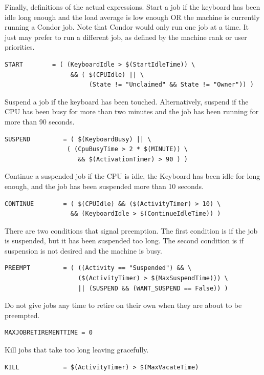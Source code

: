 Finally, definitions of the actual expressions.
Start a job if 
the keyboard has been idle long enough and
the load average is low enough OR the machine is currently
running a Condor job.
Note that Condor would only run one job at a time.
It just may prefer to run a different job, as defined by
the machine rank or user priorities.
\begin{verbatim}
START        = ( (KeyboardIdle > $(StartIdleTime)) \
                  && ( $(CPUIdle) || \
                       (State != "Unclaimed" && State != "Owner")) )
\end{verbatim}

Suspend a job if the keyboard has been touched.
Alternatively, suspend if the CPU has been busy for more than two minutes
and the job has been running for more than 90 seconds.
\begin{verbatim}
SUSPEND         = ( $(KeyboardBusy) || \
                 ( (CpuBusyTime > 2 * $(MINUTE)) \
                    && $(ActivationTimer) > 90 ) )
\end{verbatim}

Continue a suspended job if the CPU is idle, the Keyboard has been
idle for long enough, and the job has been suspended more
than 10 seconds.
\begin{verbatim}
CONTINUE        = ( $(CPUIdle) && ($(ActivityTimer) > 10) \
                  && (KeyboardIdle > $(ContinueIdleTime)) )
\end{verbatim}

There are two conditions that signal preemption.
The first condition is if the job is suspended,
but it has been suspended too long.
The second condition is if suspension is not desired and the machine is busy. 
\begin{verbatim}
PREEMPT	        = ( ((Activity == "Suspended") && \
                    ($(ActivityTimer) > $(MaxSuspendTime))) \
                    || (SUSPEND && (WANT_SUSPEND == False)) )
\end{verbatim}


Do not give jobs any time to retire on their own when they are about to
be preempted.

\begin{verbatim}
MAXJOBRETIREMENTTIME = 0
\end{verbatim}


Kill jobs that take too long leaving gracefully.
\begin{verbatim}
KILL            = $(ActivityTimer) > $(MaxVacateTime)
\end{verbatim}

